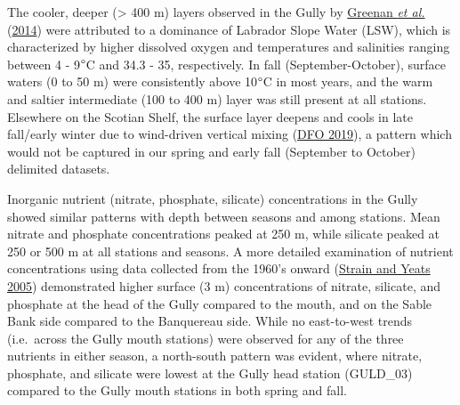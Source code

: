 \documentclass[12pt]{article}\usepackage[]{graphicx}\usepackage[]{color}
\begin{document}
The cooler, deeper (\textgreater{} 400 m) layers observed in the Gully by \protect\hyperlink{ref-greenan_2014}{Greenan \textit{et al.}} (\protect\hyperlink{ref-greenan_2014}{2014}) were attributed to a dominance of Labrador Slope Water (LSW), which is characterized by higher dissolved oxygen and temperatures and salinities ranging between 4 - 9\(\degree\)C and 34.3 - 35, respectively. In fall (September-October), surface waters (0 to 50 m) were consistently above 10\(\degree\)C in most years, and the warm and saltier intermediate (100 to 400 m) layer was still present at all stations. Elsewhere on the Scotian Shelf, the surface layer deepens and cools in late fall/early winter due to wind-driven vertical mixing (\protect\hyperlink{ref-dfo_2019}{DFO 2019}), a pattern which would not be captured in our spring and early fall (September to October) delimited datasets.

Inorganic nutrient (nitrate, phosphate, silicate) concentrations in the Gully showed similar patterns with depth between seasons and among stations. Mean nitrate and phosphate concentrations peaked at 250 m, while silicate peaked at 250 or 500 m at all stations and seasons. A more detailed examination of nutrient concentrations using data collected from the 1960's onward (\protect\hyperlink{ref-strain_2005}{Strain and Yeats 2005}) demonstrated higher surface (3 m) concentrations of nitrate, silicate, and phosphate at the head of the Gully compared to the mouth, and on the Sable Bank side compared to the Banquereau side. While no east-to-west trends (i.e.~across the Gully mouth stations) were observed for any of the three nutrients in either season, a north-south pattern was evident, where nitrate, phosphate, and silicate were lowest at the Gully head station (GULD\_03) compared to the Gully mouth stations in both spring and fall.
\end{document}
